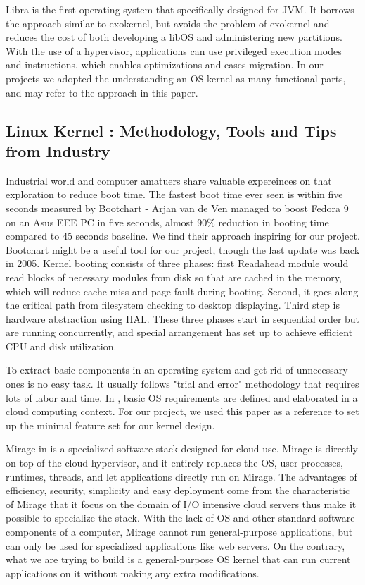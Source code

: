 Libra \cite{ammons2007libra} is the first operating system that specifically designed for JVM. It borrows the approach similar to exokernel, but avoids the problem of exokernel and reduces the cost of both developing a libOS and administering new partitions. With the use of a hypervisor, applications can use privileged execution modes and instructions, which enables optimizations and eases migration. In our projects we adopted the understanding an OS kernel as many functional parts, and may refer to the approach in this paper.

\subsection{Linux Kernel : Methodology, Tools and Tips from Industry}
Industrial world and computer amatuers share valuable expereinces on that exploration to reduce boot time. The fastest boot time ever seen is within five seconds \cite{LPC} measured by Bootchart\cite{Bootchart} - Arjan van de Ven managed to boost Fedora 9 on an Asus EEE PC in five seconds, almost 90\% reduction in booting time compared to 45 seconds baseline. We find their approach inspiring for our project. Bootchart might be a useful tool for our project, though the last update was back in 2005.
Kernel booting consists of three phases: first Readahead module would read blocks of necessary modules from disk so that are cached in the memory, which will reduce cache miss and page fault during booting. Second, it goes along the critical path from filesystem checking to desktop displaying. Third step is hardware abstraction using HAL. These three phases start in sequential order but are running concurrently, and special arrangement has set up to achieve efficient CPU and disk utilization.

To extract basic components in an operating system and get rid of unnecessary ones is no easy task. It usually follows "trial and error" methodology that requires lots of labor and time. In \cite{gong2010characteristics}, basic OS requirements are defined and elaborated in a cloud computing context. For our project, we used this paper as a reference to set up the minimal feature set for our kernel design.

Mirage in \cite{madhavapeddy2010turning} is a specialized software stack designed for cloud use. Mirage is directly on top of the cloud hypervisor, and it entirely replaces the OS, user processes, runtimes, threads, and let applications directly run on Mirage. The advantages of efficiency, security, simplicity and easy deployment come from the characteristic of Mirage that it focus on the domain of I/O intensive cloud servers thus make it possible to specialize the stack. With the lack of OS and other standard software components of a computer, Mirage cannot run general-purpose applications, but can only be used for specialized applications like web servers. On the contrary, what we are trying to build is a general-purpose OS kernel that can run current applications on it without making any extra modifications.


